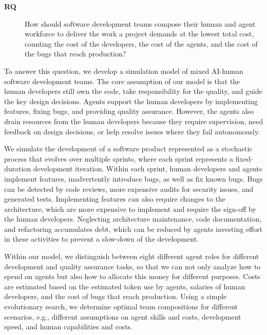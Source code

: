 \documentclass[smallextended]{svjour3}       %
\begin{document}
\begin{description}
  \item[\textbf{RQ}] How should software development teams compose their human and agent workforce to deliver the work a project demands at the lowest total cost, counting the cost of the developers, the cost of the agents, and the cost of the bugs that reach production?
\end{description}

To answer this question, we develop a simulation model of mixed AI-human software development teams. The core assumption of our model is that the human developers still own the code, take responsibility for the quality, and guide the key design decisions. Agents support the human developers by implementing features, fixing bugs, and providing quality assurance. However, the agents also drain resources from the human developers because they require supervision, need feedback on design decisions, or help resolve issues where they fail autonomously. 

We simulate the development of a software product represented as a stochastic process that evolves over multiple sprints, where each sprint represents a fixed-duration development iteration. Within each sprint, human developers and agents implement features, inadvertently introduce bugs, as well as fix known bugs. Bugs can be detected by code reviews, more expensive audits for security issues, and generated tests. Implementing features can also require changes to the architecture, which are more expensive to implement and require the sign-off by the human developers. Neglecting architecture maintenance, code documentation, and refactoring accumulates debt, which can be reduced by agents investing effort in these activities to prevent a slow-down of the development. 

Within our model, we distinguish between eight different agent roles for different development and quality assurance tasks, so that we can not only analyze how to spend on agents but also how to allocate this money for different purposes. Costs are estimated based on the estimated token use by agents, salaries of human developers, and the cost of bugs that reach production. Using a simple evolutionary search, we determine optimal team compositions for different scenarios, e.g., different assumptions on agent skills and costs, development speed, and human capabilities and costs. 
\end{document}
